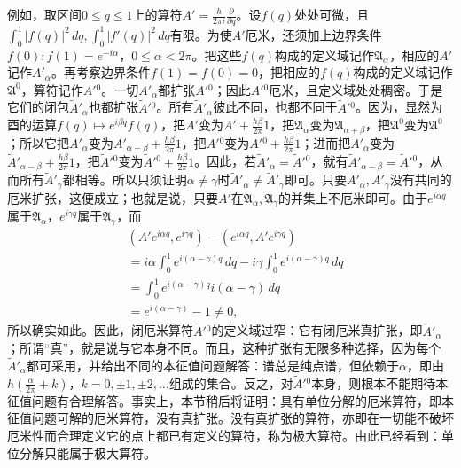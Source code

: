 \documentclass[fontsize=13pt,twoside,openany,headings=normal,parskip=false,bookmarkpackage=false,DIV=calc]{scrbook}
\begin{document}
\hypertarget{origpage-79}{}\label{origpage-79}例如，取区间$0\leq q\leq1$上的算符$A'=\frac{h}{2\pi i}\frac{\partial}{\partial q}$。设$f(q)$处处可微，且$\int_0^1|f(q)|^2\,dq,\allowbreak \int_0^1|f'(q)|^2\,dq$有限。为使$A'$厄米，还须加上边界条件$f(0):f(1)=e^{-i\alpha}$，$0\leq\alpha<2\pi$。把这些$f(q)$构成的定义域记作$\mathfrak A_\alpha$，相应的$A'$记作$A'_\alpha$。再考察边界条件$f(1)=f(0)=0$，把相应的$f(q)$构成的定义域记作$\mathfrak A^0$，算符记作$A'{}^0$。一切$A'_\alpha$都扩张$A'{}^0$；因此$A'{}^0$厄米，且定义域处处稠密。于是它们的闭包$\widetilde A'_\alpha$也都扩张$\widetilde A'{}^0$。所有$\widetilde A'_\alpha$彼此不同，也都不同于$\widetilde A'{}^0$。因为，显然为酉的运算$f(q)\mapsto e^{i\beta q}f(q)$，把$A'$变为$A'+\frac{h\beta}{2\pi}1$，把$\mathfrak A_\alpha$变为$\mathfrak A_{\alpha+\beta}$，把$\mathfrak A^0$变为$\mathfrak A^0$；所以它把$A'_\alpha$变为$A'_{\alpha-\beta}+\frac{h\beta}{2\pi}1$，把$A'{}^0$变为$A'{}^0+\frac{h\beta}{2\pi}1$；进而把$\widetilde A'_\alpha$变为$\widetilde A'_{\alpha-\beta}+\frac{h\beta}{2\pi}1$，把$\widetilde A'{}^0$变为$\widetilde A'{}^0+\frac{h\beta}{2\pi}1$。因此，若$\widetilde A'_\alpha=\widetilde A'{}^0$，就有$\widetilde A'_{\alpha-\beta}=\widetilde A'{}^0$，从而所有$\widetilde A'_\gamma$都相等。所以只须证明$\alpha\ne\gamma$时$\widetilde A'_\alpha\ne\widetilde A'_\gamma$即可。只要$A'_\alpha,\allowbreak A'_\gamma$没有共同的厄米扩张，这便成立；也就是说，只要$A'$在$\mathfrak A_\alpha,\allowbreak \mathfrak A_\gamma$的并集上不厄米即可。由于$e^{i\alpha q}$属于$\mathfrak A_\alpha$，$e^{i\gamma q}$属于$\mathfrak A_\gamma$，而
\begin{align*}
&(A'e^{i\alpha q},e^{i\gamma q})-(e^{i\alpha q},A'e^{i\gamma q})\\
&=i\alpha\int_0^1e^{i(\alpha-\gamma)q}\,dq-i\gamma\int_0^1e^{i(\alpha-\gamma)q}\,dq\\
&=\int_0^1e^{i(\alpha-\gamma)q}i(\alpha-\gamma)\,dq\\
&=e^{i(\alpha-\gamma)}-1\ne0,
\end{align*}
所以确实如此。因此，闭厄米算符$\widetilde A'{}^0$的定义域过窄：它有闭厄米真扩张，即$\widetilde A'_\alpha$；所谓“真”，就是说与它本身不同。而且，这种扩张有无限多种选择，因为每个$\widetilde A'_\alpha$都可采用，并给出不同的本征值问题解答：谱总是纯点谱，但依赖于$\alpha$，即由$h(\frac{\alpha}{2\pi}+k)$，$k=0,\allowbreak \pm1,\allowbreak \pm2,\allowbreak \ldots$组成的集合。反之，对$\widetilde A'{}^0$本身，则根本不能期待本征值问题有合理解答。事实上，本节稍后将证明：具有单位分解的厄米算符，即本征值问题可解的厄米算符，没有真扩张。没有真扩张的算符，亦即在一切能不破坏厄米性而合理定义它的点上都已有定义的算符，称为极大算符。由此已经看到：单位分解只能属于极大算符。
\end{document}

